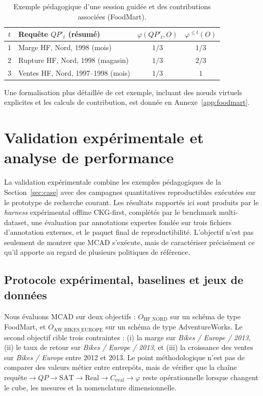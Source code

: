 \documentclass[journal]{IEEEtran}
\begin{document}
\begin{table}[!t]
\centering
\caption{Exemple pédagogique d'une session guidée et des contributions associées (FoodMart).}
\begin{tabular}{@{}clcc@{}}
\toprule
$t$ & Requête $QP'_t$ (résumé) & $\varphi(QP'_t,O)$ & $\varphi^{\le t}(O)$ \\
\midrule
1 & Marge HF, Nord, 1998 (mois) & $1/3$ & $1/3$ \\
2 & Rupture HF, Nord, 1998 (magasin) & $1/3$ & $2/3$ \\
3 & Ventes HF, Nord, 1997--1998 (mois) & $1/3$ & $1$ \\
\bottomrule
\end{tabular}
\label{tab:guided-session}
\end{table}

Une formalisation plus détaillée de cet exemple, incluant des nœuds virtuels explicites et les calculs de contribution, est donnée en Annexe~\ref{app:foodmart}.


\section{Validation expérimentale et analyse de performance}
\label{sec:exp}

La validation expérimentale combine les exemples pédagogiques de la Section~\ref{sec:case} avec des campagnes quantitatives reproductibles exécutées sur le prototype de recherche courant. Les résultats rapportés ici sont produits par le \emph{harness} expérimental offline CKG-first, complétés par le benchmark multi-dataset, une évaluation par annotations expertes fondée sur trois fichiers d'annotation externes, et le paquet final de reproductibilité. L'objectif n'est pas seulement de montrer que MCAD s'exécute, mais de caractériser précisément ce qu'il apporte au regard de plusieurs politiques de référence.

\subsection{Protocole expérimental, baselines et jeux de données}

Nous évaluons MCAD sur deux objectifs : $O_{\mathrm{HF\_NORD}}$ sur un schéma de type FoodMart, et $O_{\mathrm{AW\_BIKES\_EUROPE}}$ sur un schéma de type AdventureWorks. Le second objectif cible trois contraintes : (i) la marge sur \emph{Bikes / Europe / 2013}, (ii) le taux de retour sur \emph{Bikes / Europe / 2013}, et (iii) la croissance des ventes sur \emph{Bikes / Europe} entre 2012 et 2013. Le point méthodologique n'est pas de comparer des valeurs métier entre entrepôts, mais de vérifier que la chaîne $\text{requête} \rightarrow QP \rightarrow \mathrm{SAT} \rightarrow \mathrm{Real} \rightarrow C_{\mathrm{eval}} \rightarrow \varphi$ reste opérationnelle lorsque changent le cube, les mesures et la nomenclature dimensionnelle.
\end{document}
